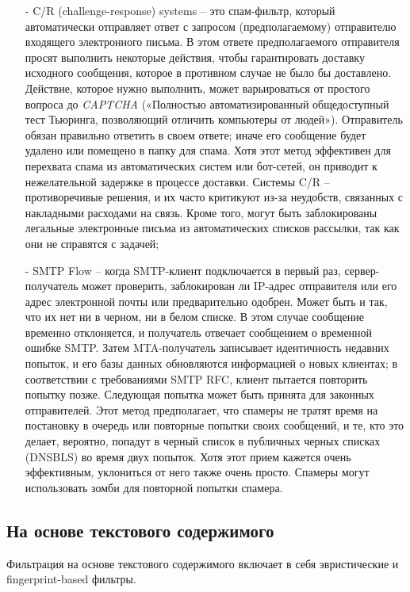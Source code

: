     \begin{itemize}
        \item[-] C/R (challenge-response) systems -- это спам-фильтр, который автоматически отправляет 
        ответ с запросом (предполагаемому) отправителю входящего электронного письма. В этом 
        ответе предполагаемого отправителя просят выполнить некоторые действия, чтобы гарантировать 
        доставку исходного сообщения, которое в противном случае не было бы доставлено. Действие, которое 
        нужно выполнить, может варьироваться от простого вопроса до \emph{CAPTCHA} («Полностью автоматизированный 
        общедоступный тест Тьюринга, позволяющий отличить компьютеры от людей»). Отправитель обязан правильно 
        ответить в своем ответе; иначе его сообщение будет удалено или помещено в папку для спама. Хотя этот 
        метод эффективен для перехвата спама из автоматических систем или бот-сетей, он приводит к нежелательной 
        задержке в процессе доставки.
        Системы C/R -- противоречивые решения, и их часто критикуют из-за неудобств, связанных с накладными расходами 
        на связь. Кроме того, могут быть заблокированы легальные электронные письма из автоматических списков 
        рассылки, так как они не справятся с задачей;
        \item[-] SMTP Flow -- когда SMTP-клиент подключается в первый раз, сервер-получатель может проверить, 
        заблокирован ли IP-адрес отправителя или его адрес электронной почты или предварительно одобрен. 
        Может быть и так, что их нет ни в черном, ни в белом списке. В этом случае сообщение временно отклоняется, 
        и получатель отвечает сообщением о временной ошибке SMTP. Затем MTA-получатель записывает идентичность недавних попыток, и его базы данных обновляются информацией о новых клиентах; в соответствии с требованиями SMTP RFC, клиент пытается повторить попытку позже. Следующая попытка может быть принята для законных отправителей. Этот метод предполагает, что спамеры не тратят время на постановку в очередь или повторные попытки своих сообщений, и те, кто это делает, вероятно, попадут в черный список в публичных черных списках (DNSBLS) во время двух попыток. Хотя этот прием кажется очень эффективным, уклониться от него также очень просто. Спамеры могут использовать зомби для повторной попытки спамера.
    \end{itemize}

\subsection{На основе текстового содержимого}
    Фильтрация на основе текстового содержимого включает в себя эвристические и fingerprint-based фильтры.

